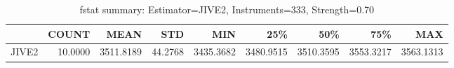 \begin{table}[ht]
\centering
\caption{fstat summary: Estimator=JIVE2, Instruments=333, Strength=0.70}
\begin{tabular}{lrrrrrrrr}
\toprule
 & COUNT & MEAN & STD & MIN & 25\% & 50\% & 75\% & MAX \\
\midrule
JIVE2 & 10.0000 & 3511.8189 & 44.2768 & 3435.3682 & 3480.9515 & 3510.3595 & 3553.3217 & 3563.1313 \\
\bottomrule
\end{tabular}
\end{table}
